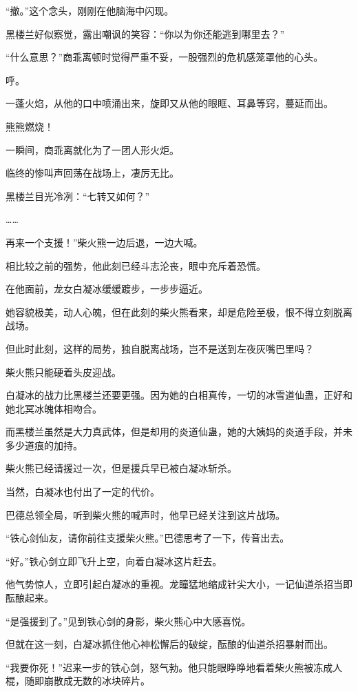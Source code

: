 \begin{this_body}
“撤。”这个念头，刚刚在他脑海中闪现。

黑楼兰好似察觉，露出嘲讽的笑容：“你以为你还能逃到哪里去？”

“什么意思？”商乖离顿时觉得严重不妥，一股强烈的危机感笼罩他的心头。

呼。

一蓬火焰，从他的口中喷涌出来，旋即又从他的眼眶、耳鼻等窍，蔓延而出。

熊熊燃烧！

一瞬间，商乖离就化为了一团人形火炬。

临终的惨叫声回荡在战场上，凄厉无比。

黑楼兰目光冷冽：“七转又如何？”

……

再来一个支援！”柴火熊一边后退，一边大喊。

相比较之前的强势，他此刻已经斗志沦丧，眼中充斥着恐慌。

在他面前，龙女白凝冰缓缓踱步，一步步逼近。

她容貌极美，动人心魄，但在此刻的柴火熊看来，却是危险至极，恨不得立刻脱离战场。

但此时此刻，这样的局势，独自脱离战场，岂不是送到左夜灰嘴巴里吗？

柴火熊只能硬着头皮迎战。

白凝冰的战力比黑楼兰还要更强。因为她的白相真传，一切的冰雪道仙蛊，正好和她北冥冰魄体相吻合。

而黑楼兰虽然是大力真武体，但是却用的炎道仙蛊，她的大姨妈的炎道手段，并未多少道痕的加持。

柴火熊已经请援过一次，但是援兵早已被白凝冰斩杀。

当然，白凝冰也付出了一定的代价。

巴德总领全局，听到柴火熊的喊声时，他早已经关注到这片战场。

“铁心剑仙友，请你前往支援柴火熊。”巴德思考了一下，传音出去。

“好。”铁心剑立即飞升上空，向着白凝冰这片赶去。

他气势惊人，立即引起白凝冰的重视。龙瞳猛地缩成针尖大小，一记仙道杀招当即酝酿起来。

“是强援到了。”见到铁心剑的身影，柴火熊心中大感喜悦。

但就在这一刻，白凝冰抓住他心神松懈后的破绽，酝酿的仙道杀招暴射而出。

“我要你死！”迟来一步的铁心剑，怒气勃。他只能眼睁睁地看着柴火熊被冻成人棍，随即崩散成无数的冰块碎片。


\end{this_body}
